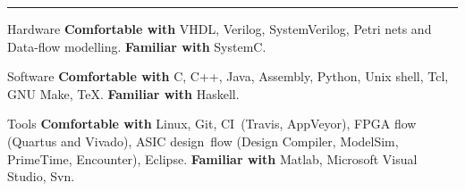 \vspace{-3mm}
\rule{\textwidth}{0.5pt}\vspace{-1mm}

\vspace{-1mm}
\begin{cvskills}

\cvskill
{Hardware}
{\textbf{Comfortable with} VHDL, Verilog, SystemVerilog, Petri nets and 
Data-flow modelling. \textbf{Familiar with} SystemC.}

\cvskill
{Software}
{\textbf{Comfortable with} C, C++, Java, Assembly, Python, Unix shell, Tcl, 
GNU Make, \TeX. \textbf{Familiar with} Haskell.}

\cvskill
{Tools}
{\textbf{Comfortable with} Linux, Git, CI~(Travis, AppVeyor), FPGA 
flow (Quartus and Vivado), ASIC design~flow (Design Compiler, ModelSim, 
PrimeTime, Encounter), Eclipse. \textbf{Familiar with} Matlab, 
Microsoft Visual Studio, Svn.}

\end{cvskills}

